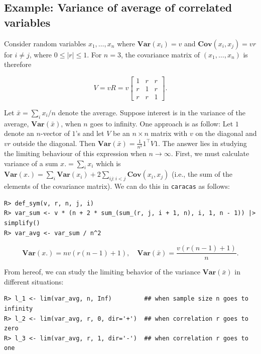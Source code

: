 \hypertarget{example-variance-of-average-of-correlated-variables}{%
\subsection{Example: Variance of average of correlated variables}\label{example-variance-of-average-of-correlated-variables}}

Consider random
variables \(x_1,\dots, x_n\) where \(\mathbf{Var}(x_i)=v\) and \(\mathbf{Cov}(x_i, x_j)=v r\) for \(i\not = j\), where \(0 \le |r| \le1\).
For \(n=3\), the covariance matrix of \((x_1,\dots, x_n)\) is therefore

\begin{equation}
  \label{eq:1}
  V = v R = v \left[\begin{matrix}1 & r & r\\r & 1 & r\\r & r & 1\end{matrix}\right]. 
\end{equation}

Let \(\bar x = \sum_i x_i / n\) denote the average. Suppose interest is
in the variance of the average, \(\mathbf{Var}(\bar x)\), when \(n\) goes to
infinity. One approach is as follow: Let \(1\) denote an \(n\)-vector of
\(1\)'s and let \(V\) be an \(n \times n\) matrix with \(v\) on the diagonal
and \(v r\) outside the diagonal. Then \(\mathbf{Var}(\bar x)=\frac 1 {n^2} 1^\top V 1\). The answer lies in studying the limiting behaviour of
this expression when \(n \rightarrow \infty\).
First, we must calculate variance of a sum \(x. = \sum_i x_i\)
which is \(\mathbf{Var}(x.) = \sum_i \mathbf{Var}(x_i) + 2 \sum_{ij:i<j} \mathbf{Cov}(x_i, x_j)\) (i.e., the sum of the elements of the covariance matrix).
We can do this in \texttt{caracas} as follows:

\begin{verbatim}
R> def_sym(v, r, n, j, i) 
R> var_sum <- v * (n + 2 * sum_(sum_(r, j, i + 1, n), i, 1, n - 1)) |> simplify()
R> var_avg <- var_sum / n^2
\end{verbatim}

\[
\mathbf{Var}(x.) = n v \left(r \left(n - 1\right) + 1\right),
\quad
\mathbf{Var}(\bar x) = \frac{v \left(r \left(n - 1\right) + 1\right)}{n}.
\]

From hereof, we can study the limiting behavior of the variance
\(\mathbf{Var}(\bar x)\) in different situations:

\begin{verbatim}
R> l_1 <- lim(var_avg, n, Inf)         ## when sample size n goes to infinity
R> l_2 <- lim(var_avg, r, 0, dir='+')  ## when correlation r goes to zero
R> l_3 <- lim(var_avg, r, 1, dir='-')  ## when correlation r goes to one
\end{verbatim}

